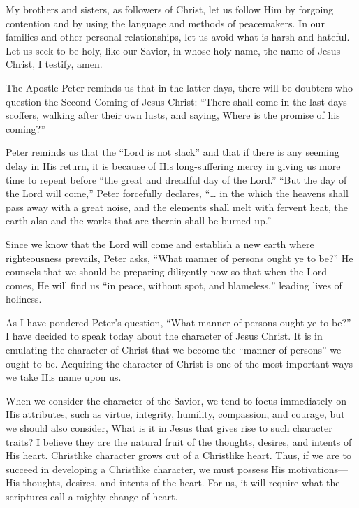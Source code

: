 \documentclass[letterpaper, 11pt]{report}
\newcommand{\speaker}{}
\newcommand{\talk}{}
\newcommand{\talkdatestr}{}
\newcommand{\setspeaker}[1]{\renewcommand{\speaker}{#1}}
\newcommand{\settalk}[1]{\renewcommand{\talk}{#1}}
\newcommand{\talkheading}[2]{%
    \vspace{1em}
    \noindent{\huge\bfseries #1}
    \par\nopagebreak\vspace{0.25em}
    \noindent{\normalsize\bfseries #2\ifx\talkdatestr\empty\else,\ \talkdatestr\fi}
    \par\nopagebreak\vspace{0.5em}
}
\begin{document}
My brothers and sisters, as followers of Christ, let us follow Him by forgoing contention and by using the language and methods of peacemakers. In our families and other personal relationships, let us avoid what is harsh and hateful. Let us seek to be holy, like our Savior, in whose holy name, the name of Jesus Christ, I testify, amen.

\newpage
\settalk{The Character of Christ}
\setspeaker{D. Todd Christofferson}
\talkheading{The Character of Christ}{D. Todd Christofferson}

The Apostle Peter reminds us that in the latter days, there will be doubters who question the Second Coming of Jesus Christ: “There shall come in the last days scoffers, walking after their own lusts, and saying, Where is the promise of his coming?”

Peter reminds us that the “Lord is not slack” and that if there is any seeming delay in His return, it is because of His long-suffering mercy in giving us more time to repent before “the great and dreadful day of the Lord.” “But the day of the Lord will come,” Peter forcefully declares, “… in the which the heavens shall pass away with a great noise, and the elements shall melt with fervent heat, the earth also and the works that are therein shall be burned up.”

Since we know that the Lord will come and establish a new earth where righteousness prevails, Peter asks, “What manner of persons ought ye to be?” He counsels that we should be preparing diligently now so that when the Lord comes, He will find us “in peace, without spot, and blameless,” leading lives of holiness.

As I have pondered Peter’s question, “What manner of persons ought ye to be?” I have decided to speak today about the character of Jesus Christ. It is in emulating the character of Christ that we become the “manner of persons” we ought to be. Acquiring the character of Christ is one of the most important ways we take His name upon us.

When we consider the character of the Savior, we tend to focus immediately on His attributes, such as virtue, integrity, humility, compassion, and courage, but we should also consider, What is it in Jesus that gives rise to such character traits? I believe they are the natural fruit of the thoughts, desires, and intents of His heart. Christlike character grows out of a Christlike heart. Thus, if we are to succeed in developing a Christlike character, we must possess His motivations—His thoughts, desires, and intents of the heart. For us, it will require what the scriptures call a mighty change of heart.
\end{document}

